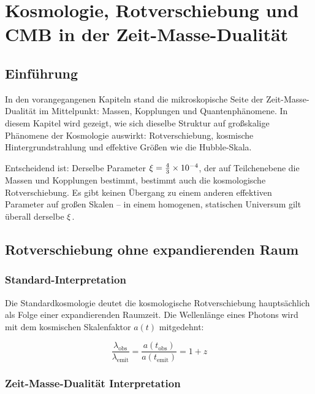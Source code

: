 
\chapter{Kosmologie, Rotverschiebung und CMB in der Zeit-Masse-Dualität}

\section{Einführung}

In den vorangegangenen Kapiteln stand die mikroskopische Seite der 
Zeit-Masse-Dualität im Mittelpunkt: Massen, Kopplungen und Quantenphänomene. 
In diesem Kapitel wird gezeigt, wie sich dieselbe Struktur auf großskalige 
Phänomene der Kosmologie auswirkt: Rotverschiebung, kosmische 
Hintergrundstrahlung und effektive Größen wie die Hubble-Skala.

Entscheidend ist: Derselbe Parameter $\xi = \frac{4}{3} \times 10^{-4}$, 
der auf Teilchenebene die Massen und Kopplungen bestimmt, bestimmt auch die 
kosmologische Rotverschiebung. Es gibt keinen Übergang zu einem anderen 
effektiven Parameter auf großen Skalen -- in einem homogenen, statischen 
Universum gilt überall derselbe $\xi$.

\section{Rotverschiebung ohne expandierenden Raum}

\subsection{Standard-Interpretation}

Die Standardkosmologie deutet die kosmologische Rotverschiebung hauptsächlich 
als Folge einer expandierenden Raumzeit. Die Wellenlänge eines Photons wird 
mit dem kosmischen Skalenfaktor $a(t)$ mitgedehnt:

\begin{equation}
\frac{\lambda_{\text{obs}}}{\lambda_{\text{emit}}} = \frac{a(t_{\text{obs}})}{a(t_{\text{emit}})} = 1 + z
\end{equation}

\subsection{Zeit-Masse-Dualität Interpretation}

